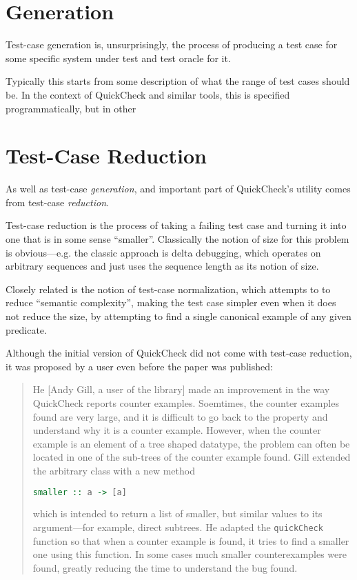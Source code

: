 \section{Generation}

Test-case generation is,
unsurprisingly,
the process of producing a test case for some specific system under test and test oracle for it.

Typically this starts from some description of what the range of test cases should be.
In the context of QuickCheck and similar tools,
this is specified programmatically,
but in other

\section{Test-Case Reduction}\label{sec:shrinking}

As well as test-case \emph{generation},
and important part of QuickCheck's utility comes from test-case \emph{reduction}.

Test-case reduction is the process of taking a failing test case and turning it into one that is in some sense ``smaller''.
Classically the notion of size for this problem is obvious---e.g.
the classic approach is delta debugging\cite{DBLP:journals/tse/ZellerH02},
which operates on arbitrary sequences and just uses the sequence length as its notion of size.

Closely related is the notion of test-case normalization\cite{DBLP:conf/issta/GroceHK17},
which attempts to to reduce ``semantic complexity'',
making the test case simpler even when it does not reduce the size,
by attempting to find a single canonical example of any given predicate.

Although the initial version of QuickCheck did not come with test-case reduction,
it was proposed by a user even before the paper was published:

\begin{quote}
He [Andy Gill, a user of the library] made an improvement in the way QuickCheck reports counter examples.
Soemtimes, the counter examples found are very large,
and it is difficult to go back to the property and understand why it is a counter example.
However,
when the counter example is an element of a tree shaped datatype,
the problem can often be located in one of the sub-trees of the counter example found.
Gill extended the arbitrary class with a new method

\begin{lstlisting}[language=Haskell]
smaller :: a -> [a]
\end{lstlisting}

which is intended to return a list of smaller, but similar values to its argument---for example, direct subtrees.
He adapted the \texttt{quickCheck} function so that when a counter example is found,
it tries to find a smaller one using this function.
In some cases much smaller counterexamples were found,
greatly reducing the time to understand the bug found.
\end{quote}

